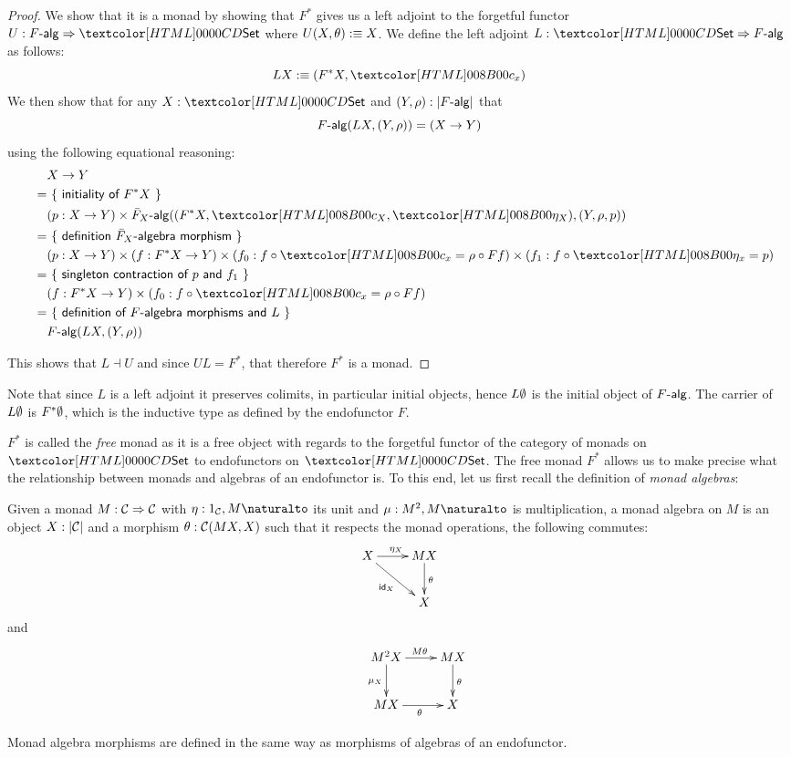 \begin{proof}
  We show that it is a monad by showing that $F^*$ gives us a left
  adjoint to the forgetful functor $U : \Func{\algcat{F}}{\Set}$ where
  $U (X , \theta) :\equiv X$. We define the left adjoint
  $L : \Func{\Set}{\algcat{F}}$ as follows:
  $$
  L X \ddefeq (F^* X , \Fstarc_x)
  $$
  We then show that for any $X : \Set$ and $(Y,\rho) : | \algcat{F} |$ that
  $$
  \algcat{F}(L X , (Y,\rho)) = (X \to Y)
  $$
  using the following equational reasoning:
  \begin{align*}
    &&&X \to Y \\
    &&=&\ \reasontext{initiality of $F^* X$} \\
    &&&(p : X \to Y) \times \algcat{\bar{F}_X}((F^* X , \Fstarc_X , \Fstareta_X),(Y,\rho,p)) \\
    &&=&\ \reasontext{definition $\bar{F}_X$-algebra morphism} \\
    &&&(p : X \to Y) \times (f : F^* X \to Y) \times (f_0 : f \circ \Fstarc_x = \rho \circ Ff) \times (f_1 : f \circ \Fstareta_x = p) \\
    &&=&\ \reasontext{singleton contraction of $p$ and $f_1$} \\
    &&&(f : F^* X \to Y) \times (f_0 : f \circ \Fstarc_x = \rho \circ Ff) \\
    &&=&\ \reasontext{definition of $F$-algebra morphisms and $L$} \\
    &&&\algcat{F}(L X , (Y,\rho))
  \end{align*}

  This shows that $L \dashv U$ and since $UL = F^*$, that therefore
  $F^*$ is a monad.
\end{proof}

Note that since $L$ is a left adjoint it preserves colimits, in
particular initial objects, hence $L \emptyset$ is the initial object
of $\algcat{F}$. The carrier of $L \emptyset$ is $F^* \emptyset$, which
is the inductive type as defined by the endofunctor $F$.

$F^*$ is called the \emph{free} monad as it is a free object with
regards to the forgetful functor of the category of monads on $\Set$
to endofunctors on $\Set$. The free monad $F^*$ allows us to make
precise what the relationship between monads and algebras of an
endofunctor is. To this end, let us first recall the definition of
\emph{monad algebras}:

\begin{definition}
  Given a monad $M : \mathcal{C} \Rightarrow \mathcal{C}$ with $\eta : \Nat{1_{\Cc},M}$
  its unit and $\mu : \Nat{M^2,M}$ is multiplication, a monad algebra
  on $M$ is an object $X : | \mathcal{C} |$ and a morphism
  $\theta : \mathcal{C}(MX,X)$ such that it respects the monad operations, \ie
  the following commutes:
  $$
  \xymatrix{
    X \ar[r]^{\eta_X} \ar[dr]_{\id_X} &MX \ar[d]^{\theta} \\
    &X
  }
  $$
  and
  $$
  \xymatrix{
    &M^2 X \ar[r]^{M \theta} \ar[d]_{\mu_X} &MX \ar[d]^{\theta} \\
    &MX \ar[r]_{\theta} &X
  }
  $$

  Monad algebra morphisms are defined in the same way as morphisms of
  algebras of an endofunctor.
\end{definition}

